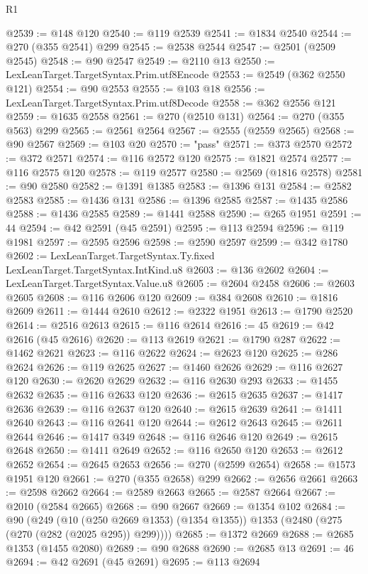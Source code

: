 \begin{lexlean}{R1}
\begin{coremodule}
@2539 := @148 @120
@2540 := @119 @2539
@2541 := @1834 @2540
@2544 := @270 (@355 @2541) @299
@2545 := @2538 @2544
@2547 := @2501 (@2509 @2545)
@2548 := @90 @2547
@2549 := @2110 @13
@2550 := LexLeanTarget.TargetSyntax.Prim.utf8Encode
@2553 := @2549 (@362 @2550 @121)
@2554 := @90 @2553
@2555 := @103 @18
@2556 := LexLeanTarget.TargetSyntax.Prim.utf8Decode
@2558 := @362 @2556 @121
@2559 := @1635 @2558
@2561 := @270 (@2510 @131)
@2564 := @270 (@355 @563) @299
@2565 := @2561 @2564
@2567 := @2555 (@2559 @2565)
@2568 := @90 @2567
@2569 := @103 @20
@2570 := "pass"
@2571 := @373 @2570
@2572 := @372 @2571
@2574 := @116 @2572 @120
@2575 := @1821 @2574
@2577 := @116 @2575 @120
@2578 := @119 @2577
@2580 := @2569 (@1816 @2578)
@2581 := @90 @2580
@2582 := @1391 @1385
@2583 := @1396 @131
@2584 := @2582 @2583
@2585 := @1436 @131
@2586 := @1396 @2585
@2587 := @1435 @2586
@2588 := @1436 @2585
@2589 := @1441 @2588
@2590 := @265 @1951
@2591 := 44
@2594 := @42 @2591 (@45 @2591)
@2595 := @113 @2594
@2596 := @119 @1981
@2597 := @2595 @2596
@2598 := @2590 @2597
@2599 := @342 @1780
@2602 := LexLeanTarget.TargetSyntax.Ty.fixed LexLeanTarget.TargetSyntax.IntKind.u8
@2603 := @136 @2602
@2604 := LexLeanTarget.TargetSyntax.Value.u8
@2605 := @2604 @2458
@2606 := @2603 @2605
@2608 := @116 @2606 @120
@2609 := @384 @2608
@2610 := @1816 @2609
@2611 := @1444 @2610
@2612 := @2322 @1951
@2613 := @1790 @2520
@2614 := @2516 @2613
@2615 := @116 @2614
@2616 := 45
@2619 := @42 @2616 (@45 @2616)
@2620 := @113 @2619
@2621 := @1790 @287
@2622 := @1462 @2621
@2623 := @116 @2622
@2624 := @2623 @120
@2625 := @286 @2624
@2626 := @119 @2625
@2627 := @1460 @2626
@2629 := @116 @2627 @120
@2630 := @2620 @2629
@2632 := @116 @2630 @293
@2633 := @1455 @2632
@2635 := @116 @2633 @120
@2636 := @2615 @2635
@2637 := @1417 @2636
@2639 := @116 @2637 @120
@2640 := @2615 @2639
@2641 := @1411 @2640
@2643 := @116 @2641 @120
@2644 := @2612 @2643
@2645 := @2611 @2644
@2646 := @1417 @349
@2648 := @116 @2646 @120
@2649 := @2615 @2648
@2650 := @1411 @2649
@2652 := @116 @2650 @120
@2653 := @2612 @2652
@2654 := @2645 @2653
@2656 := @270 (@2599 @2654)
@2658 := @1573 @1951 @120
@2661 := @270 (@355 @2658) @299
@2662 := @2656 @2661
@2663 := @2598 @2662
@2664 := @2589 @2663
@2665 := @2587 @2664
@2667 := @2010 (@2584 @2665)
@2668 := @90 @2667
@2669 := @1354 @102
@2684 := @90
    (@249
      (@10 (@250 @2669 @1353) (@1354 @1355))
      @1353
      (@2480 (@275 (@270 (@282 (@2025 @295)) @299))))
@2685 := @1372 @2669
@2688 := @2685 @1353 (@1455 @2080)
@2689 := @90 @2688
@2690 := @2685 @13
@2691 := 46
@2694 := @42 @2691 (@45 @2691)
@2695 := @113 @2694

\end{coremodule}
\end{lexlean}
